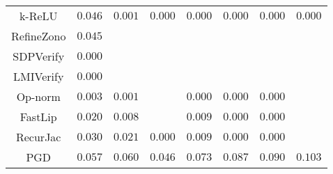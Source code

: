 \begin{table}
{\begin{tabular}{c|c|c|c|c|c|c|c}
       k-ReLU &       $0.046$ &       $0.001$ &       $0.000$ &       $0.000$ &       $0.000$ &       $0.000$ &       $0.000$ \\
   RefineZono &       $0.045$ &               &               &               &               &               &               \\
    SDPVerify &       $0.000$ &               &               &               &               &               &               \\
    LMIVerify &       $0.000$ &               &               &               &               &               &               \\
      Op-norm &       $0.003$ &       $0.001$ &               &       $0.000$ &       $0.000$ &       $0.000$ &               \\
      FastLip &       $0.020$ &       $0.008$ &               &       $0.009$ &       $0.000$ &       $0.000$ &               \\
     RecurJac &       $0.030$ &       $0.021$ &       $0.000$ &       $0.009$ &       $0.000$ &       $0.000$ &               \\
\hline
          PGD &       $0.057$ &       $0.060$ &       $0.046$ &       $0.073$ &       $0.087$ &       $0.090$ &       $0.103$ \\

    \bottomrule
    \end{tabular}
    }
    \label{table:exp-A-average-radius-mnist-0}
\end{table}
    

